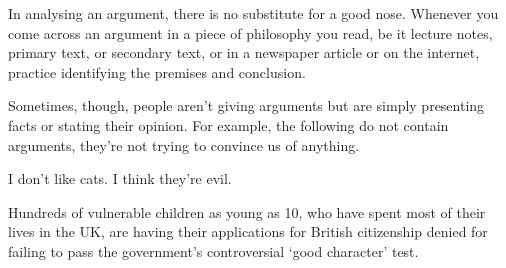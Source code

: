 



In analysing an argument, there is no substitute for a good nose. 
Whenever you come across an argument in a
piece of philosophy you read, be it lecture notes,
primary text, or secondary text, or in a newspaper
article or on the internet, practice identifying the
premises and conclusion.

Sometimes, though, people aren't giving arguments but are simply presenting facts or stating their opinion.
For example, the following do not contain arguments, they're not trying to convince us of anything. 
\begin{ebullet}
\item I don't like cats. I think they're evil. 
\item Hundreds of vulnerable children as young as 10, who have spent most of their lives in the UK, are having their applications for British citizenship denied for failing to pass the government's controversial `good character' test.
\end{ebullet}


